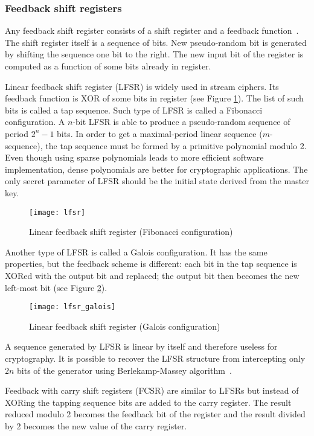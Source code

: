 \subsubsection{Feedback shift registers}

Any feedback shift register consists of a shift register and a feedback
function~\cite{schneier:applied_cryptography:2}. The shift register itself is a
sequence of bits. New pseudo-random bit is generated by shifting the sequence
one bit to the right. The new input bit of the register is computed as a
function of some bits already in register.

Linear feedback shift register (LFSR) is widely used in stream ciphers. Its
feedback function is XOR of some bits in register (see Figure
\ref{fig:lfsr-fib}).  The list of such bits is called a tap sequence. Such type
of LFSR is called a Fibonacci configuration. A $n$-bit LFSR is able to produce a
pseudo-random sequence of period $2^n - 1$ bits. In order to get a
maximal-period linear sequence ($m$-sequence), the tap sequence must be formed
by a primitive polynomial modulo 2. Even though using sparse polynomials leads
to more efficient software implementation, dense polynomials are better for
cryptographic applications. The only secret parameter of LFSR should be the
initial state derived from the master key.
\begin{figure}[htbp]
    \centering
    \texttt{[image: lfsr]}
    \caption{Linear feedback shift register (Fibonacci configuration)}
    \label{fig:lfsr-fib}
\end{figure}
Another type of LFSR is called a Galois configuration. It has the same
properties, but the feedback scheme is different: each bit in the tap sequence
is XORed with the output bit and replaced; the output bit then becomes the new
left-most bit (see Figure \ref{fig:lfsr-galois}).
\begin{figure}[htbp]
    \centering
    \texttt{[image: lfsr\_galois]}
    \caption{Linear feedback shift register (Galois configuration)}
    \label{fig:lfsr-galois}
\end{figure}
A sequence generated by LFSR is linear by itself and therefore useless for
cryptography. It is possible to recover the LFSR structure from intercepting
only $2n$ bits of the generator using Berlekamp-Massey algorithm~\cite{joux:algorithmic_cryptanalysis}. 

Feedback with carry shift registers (FCSR) are similar to LFSRs but instead of
XORing the tapping sequence bits are added to the carry register. The result
reduced modulo 2 becomes the feedback bit of the register and the result divided
by 2 becomes the new value of the carry register.

